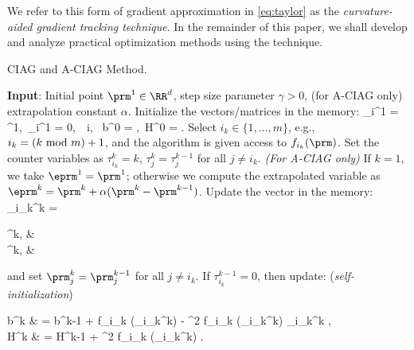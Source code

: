 \documentclass[smallextended]{svjour3}       %
\begin{document}
We refer to this form of gradient approximation in \eqref{eq:taylor} as the \emph{curvature-aided gradient tracking technique}. In the remainder of this paper, we shall develop and analyze practical optimization methods using the technique.
 \vspace{-.2cm}
  
\begin{algorithm}[t]
\caption{{\sf CIAG} and {\sf A-CIAG} Method.}\label{alg:aciag}
  \begin{algorithmic}[1]
  \STATE \textbf{Input}: Initial point $\prm^1 \in \RR^d$, step size parameter $\gamma > 0$, (for {\sf A-CIAG} only) extrapolation constant $\alpha$.
  \STATE Initialize the vectors/matrices in the memory:\vspace{-.1cm}
  \beq \label{eq:ciag_n_init}
   \prm_i^1 = \prm^1,~\tau_i^1 = 0,~\forall~i,~ {\bm b}^0 = {},~{\bm H}^0 = {} \eqs. \vspace{-.5cm}
  \eeq
  \STATE \label{ciag_n:sel} Select $i_k \in \{1,...,m\}$, e.g., $i_k = (k~{\rm mod}~m) + 1$,
  and the algorithm is given access to $f_{i_k}(\prm)$.
  Set the counter variables as $\tau_{i_k}^k = k$, $\tau_j^k = \tau_j^{k-1}$ for all $j \neq i_k$.
  \STATE  \emph{(For {\sf A-CIAG} only)} If $k = 1$, we take $\eprm^{1} = \prm^1$; otherwise we compute the extrapolated variable as
 $ \eprm^k = \prm^k + \alpha ( \prm^k - \prm^{k-1} )$. 
  \STATE Update the vector in the memory:\vspace{-.2cm}
  \beq
  \prm_{i_k}^k = \begin{cases}
\prm^k, &  \\
\eprm^k, &  
\end{cases}
  \eeq 
  and set $\prm_{j}^k = \prm_j^{k-1}$ for all $j \neq i_k$. 
   \STATE \label{ciag_n:sums} 
   If $\tau_{i_k}^{k-1} = 0$, then update: (\emph{self-initialization})\vspace{-.1cm}
   \beq \label{eq:ciag_n_inc_init}
   \begin{split}
   {\bm b}^{k} & = {\bm b}^{k-1} + \grd f_{i_k} (\prm_{i_k}^k) - \grd^2 f_{i_k} (\prm_{i_k}^k) \prm_{i_k}^k \eqs, \\
   {\bm H}^{k} & = {\bm H}^{k-1} + \grd^2 f_{i_k} (\prm_{i_k}^k) \eqs.\\[-.3cm]

\end{split}
\end{algorithmic}
\end{algorithm}
\end{document}
